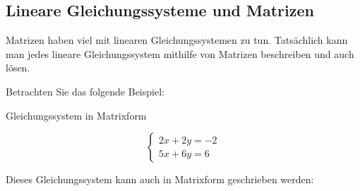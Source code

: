   \clearpage
  \subsection{Lineare Gleichungssysteme und Matrizen}

Matrizen haben viel mit linearen Gleichungssystemen zu tun. Tatsächlich kann man jedes lineare Gleichungssystem mithilfe von Matrizen beschreiben und auch lösen.

Betrachten Sie das folgende Beispiel:

\begin{bsp}
    {Gleichungssystem in Matrixform}{}

\[
\begin{cases}
2x + 2y = -2 \\
5x + 6y = 6
\end{cases}
\]

Dieses Gleichungssystem kann auch in Matrixform geschrieben werden:

\vspace*{15cm}






\end{bsp}
